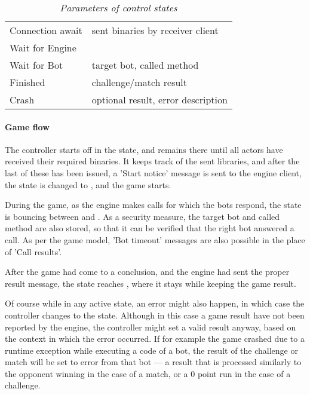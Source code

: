 		\begin{table}[h]
			\centering
			\setlength{\tabcolsep}{8pt}
			\renewcommand{\arraystretch}{1.5}
			\begin{tabularx}{0.8\linewidth}{
				|>{\hsize=0.7\hsize}X|%
				>{\hsize1.3\hsize}X|%
			  }
				\hline
				 \multicolumn{1}{|c|}{\textbf{Control state}} &%
				 \multicolumn{1}{c|}{\textbf{Parameters}} \\ \hline
				
				Connection await & sent binaries by receiver client \\ \hline
				Wait for Engine & \emptycell \\ \hline
				Wait for Bot & target bot, called method \\ \hline
				Finished & challenge/match result \\ \hline
				Crash & optional result, error description \\ \hline
			\end{tabularx}
			\caption*{\emph{Parameters of control states}}
		\end{table}

			\paragraph{Game flow}
			
			The controller starts off in the  state, and remains there until all actors have received their required binaries. It keeps track of the sent libraries, and after the last of these has been issued, a 'Start notice' message is sent to the engine client, the state is changed to , and the game starts.
			
			During the game, as the engine makes calls for which the bots respond, the state is bouncing between  and . As a security measure, the target bot and called method are also stored, so that it can be verified that the right bot answered a call. As per the game model, 'Bot timeout' messages are also possible in the place of 'Call results'.
			
			After the game had come to a conclusion, and the engine had sent the proper result message, the state reaches , where it stays while keeping the game result.
			
			Of course while in any active state, an error might also happen, in which case the controller changes to the  state. Although in this case a game result have not been reported by the engine, the controller might set a valid result anyway, based on the context in which the error occurred. If for example the game crashed due to a runtime exception while executing a code of a bot, the result of the challenge or match will be set to error from that bot --- a result that is processed similarly to the opponent winning in the case of a match, or a 0 point run in the case of a challenge.

